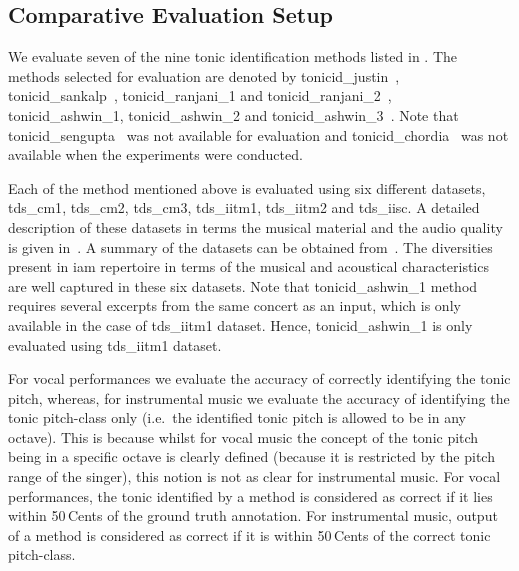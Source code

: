 \subsection{Comparative Evaluation Setup}
\label{sec:pre_processing_experimental_setup}

We evaluate seven of the nine tonic identification methods listed in . The methods selected for evaluation are
denoted by \acrshort{tonicid_justin}~\citep{salamon2012multipitch}, \acrshort{tonicid_sankalp}~\citep{gulati2012two}, \acrshort{tonicid_ranjani_1} and \acrshort{tonicid_ranjani_2}~\citep{ranjani2011carnatic}, \acrshort{tonicid_ashwin_1}, \acrshort{tonicid_ashwin_2} and \acrshort{tonicid_ashwin_3}~\citep{bellur2012knowledge}. Note that \acrshort{tonicid_sengupta}~\citep{Sengupta2005b} was not available for
evaluation and \acrshort{tonicid_chordia}~\citep{chordia2013joint} was not available when the experiments were conducted. 

Each of the method mentioned above is evaluated using six different datasets, \acrshort{tds_cm1}, \acrshort{tds_cm2}, \acrshort{tds_cm3}, \acrshort{tds_iitm1}, \acrshort{tds_iitm2} and \acrshort{tds_iisc}. A detailed description of these datasets in terms the musical material and the audio quality is given in~. A summary of the datasets can be obtained from~. The diversities present in \gls{iam} repertoire in terms of the musical and acoustical characteristics are well captured in these six datasets. Note that \acrshort{tonicid_ashwin_1} method requires several excerpts from the same concert as an input, which is only available in the case of \acrshort{tds_iitm1} dataset. Hence, \acrshort{tonicid_ashwin_1} is only evaluated using \acrshort{tds_iitm1} dataset.

For vocal performances we evaluate the accuracy of correctly identifying the tonic pitch, whereas, for instrumental music we evaluate the accuracy of identifying the tonic pitch-class only (i.e.~the identified tonic pitch is allowed to be in any octave). This is because whilst for vocal music the concept of the tonic pitch being in a specific octave is clearly defined (because it is restricted by the pitch range of the singer), this notion is not as clear for instrumental music. For vocal performances, the tonic identified by a method is considered as correct if it lies within 50\,Cents of the ground truth annotation. For instrumental music, output of a method is considered as correct if it is within 50\,Cents of the correct tonic pitch-class.

